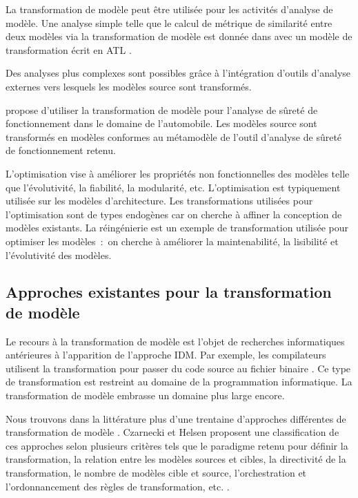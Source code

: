 \begin{description}
La transformation de modèle peut être utilisée pour les activités d'analyse de 
modèle. Une analyse simple telle que le calcul de métrique de similarité entre 
deux modèles via la transformation de modèle est donnée dans \cite{del2007semi} 
avec un modèle de transformation écrit en ATL \cite{jouault2006transforming}. 

Des analyses plus complexes sont possibles grâce à l'intégration d'outils 
d'analyse externes vers lesquels les modèles source sont transformés.

\cite{biehl2010integrating} propose d'utiliser la transformation de modèle pour 
l'analyse de sûreté de fonctionnement dans le domaine de l'automobile. Les 
modèles source sont transformés en modèles conformes au métamodèle de l'outil 
d'analyse de sûreté de fonctionnement retenu.
 
L'optimisation vise à améliorer les propriétés non fonctionnelles des modèles 
telle que l'évolutivité, la fiabilité, la modularité, etc. L'optimisation est 
typiquement utilisée sur les modèles d'architecture. Les transformations 
utilisées pour l'optimisation sont de types endogènes car on cherche à affiner 
la conception de modèles existants. La réingénierie est un exemple de 
transformation utilisée pour optimiser les modèles~:~on cherche à améliorer la 
maintenabilité, la lisibilité et l'évolutivité des modèles.

\end{description}

\subsection{Approches existantes pour la transformation de modèle}  
Le recours à la transformation de modèle est l'objet de recherches informatiques 
antérieures à l'apparition de l'approche IDM. Par exemple, les compilateurs 
utilisent la transformation pour passer du code source au fichier binaire 
\cite{aho1985compilers}. Ce type de transformation est restreint au domaine de 
la programmation informatique. La transformation de modèle embrasse un domaine 
plus large encore.

Nous trouvons dans la littérature plus d'une trentaine d'approches différentes 
de transformation de modèle \cite{syriani2011multi}. Czarnecki et Helsen 
proposent une classification de ces approches selon plusieurs critères tels que 
le paradigme retenu pour définir la transformation, la relation entre les 
modèles sources et cibles, la directivité de la transformation, le nombre de 
modèles cible et source, l'orchestration et l'ordonnancement des règles de 
transformation, etc. \cite{czarnecki2006feature}.

